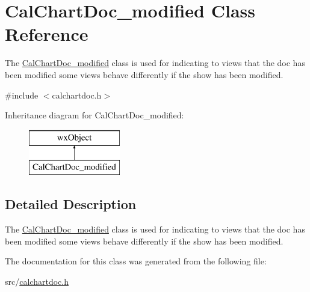 \hypertarget{a00023}{\section{Cal\-Chart\-Doc\-\_\-modified Class Reference}
\label{a00023}
}


The \hyperlink{a00023}{Cal\-Chart\-Doc\-\_\-modified} class is used for indicating to views that the doc has been modified some views behave differently if the show has been modified.  




{\ttfamily \#include $<$calchartdoc.\-h$>$}

Inheritance diagram for Cal\-Chart\-Doc\-\_\-modified\-:\begin{figure}[H]
\begin{center}
\leavevmode
\includegraphics[height=2.000000cm]{a00023}
\end{center}
\end{figure}


\subsection{Detailed Description}
The \hyperlink{a00023}{Cal\-Chart\-Doc\-\_\-modified} class is used for indicating to views that the doc has been modified some views behave differently if the show has been modified. 

The documentation for this class was generated from the following file\-:\begin{DoxyCompactItemize}
\item 
src/\hyperlink{a00181}{calchartdoc.\-h}\end{DoxyCompactItemize}
